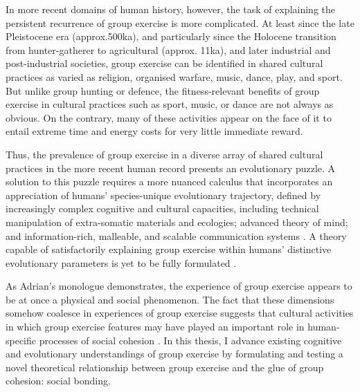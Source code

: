 \begin{CJK}{UTF8}{gbsn}
In more recent domains of human history, however, the task of explaining the persistent recurrence of group exercise is more complicated.  At least since the late Pleistocene era (approx.500ka), and particularly since the Holocene transition from hunter-gatherer to agricultural (approx. 11ka), and later industrial and post-industrial societies, group exercise can be identified in shared cultural practices as varied as religion, organised warfare, music, dance, play, and sport.  But unlike group hunting or defence, the fitness-relevant benefits of group exercise in cultural practices such as sport, music, or dance are not always as obvious.  On the contrary, many of these activities appear on the face of it to entail extreme time and energy costs for very little immediate reward.

Thus, the prevalence of group exercise in a diverse array of shared cultural practices in the more recent human record presents an evolutionary puzzle.  A solution to this puzzle requires a more nuanced calculus that incorporates an appreciation of humans' species-unique evolutionary trajectory, defined by increasingly complex cognitive and cultural capacities, including technical manipulation of extra-somatic materials and ecologies; advanced theory of mind; and information-rich, malleable, and scalable communication systems \citep{Roepstorff2010,Clark2015,Fuentes2016}.  A theory capable of satisfactorily explaining group exercise within humans' distinctive evolutionary parameters is yet to be fully formulated \citep{Cohen2017}.

As Adrian's monologue demonstrates, the experience of group exercise appears to be at once a physical and social phenomenon.  The fact that these dimensions somehow coalesce in experiences of group exercise suggests that cultural activities in which group exercise features may have played an important role in human-specific processes of social cohesion \citep{Dunbar2010,Whitehouse2004,Cohen2017}.  In  this thesis, I advance existing cognitive and evolutionary understandings of group exercise by formulating and testing a novel theoretical relationship between group exercise and the glue of group cohesion: social bonding.


\end{CJK}
